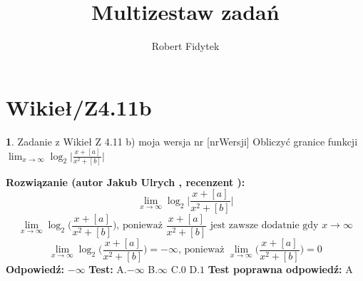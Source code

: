 \documentclass[12pt, a4paper]{article}
\title{Multizestaw zadań}
\author{Robert Fidytek}
\date{}
\theoremstyle{definition} %
\newtheorem{zad}{}
\newcommand{\kategoria}[1]{\section{#1}} %
\newcommand{\zadStart}[1]{\begin{zad}#1\newline} %
\newcommand{\zadStop}{\end{zad}}   %
\newcommand{\rozwStart}[2]{\noindent \textbf{Rozwiązanie (autor #1 , recenzent #2): }\newline} %
\newcommand{\odpStart}{\noindent \textbf{Odpowiedź:}\newline}    %
\newcommand{\odpStop}{\newline}                                             %
\newcommand{\testStart}{\noindent \textbf{Test:}\newline} %
\newcommand{\testStop}{\newline} %
\newcommand{\kluczStart}{\noindent \textbf{Test poprawna odpowiedź:}\newline} %
\newcommand{\kluczStop}{\newline} %
\begin{document}
\maketitle


\kategoria{Wikieł/Z4.11b}
\zadStart{Zadanie z Wikieł Z 4.11 b) moja wersja nr [nrWersji]}
Obliczyć granice funkcji $\lim_{x \to \infty}\log_{2}\bigg|\frac{x+[a]}{x^{2}+[b]}\bigg|$
\zadStop
\rozwStart{Jakub Ulrych}{}
$$\lim_{x \to \infty}\log_{2}\bigg|\frac{x+[a]}{x^{2}+[b]}\bigg|$$
$$\lim_{x \to \infty}\log_{2}\bigg(\frac{x+[a]}{x^{2}+[b]}\bigg)\text{, ponieważ }\frac{x+[a]}{x^{2}+[b]}\text{ jest zawsze dodatnie gdy }x\to\infty$$
$$\lim_{x \to \infty}\log_{2}\bigg(\frac{x+[a]}{x^{2}+[b]}\bigg)=-\infty\text{, ponieważ }\lim_{x \to \infty}\bigg(\frac{x+[a]}{x^{2}+[b]}\bigg)=0$$
\odpStart
$-\infty$
\odpStop
\testStart
A.$-\infty$
B.$\infty$
C.$0$
D.$1$
\testStop
\kluczStart
A
\kluczStop
\end{document}
